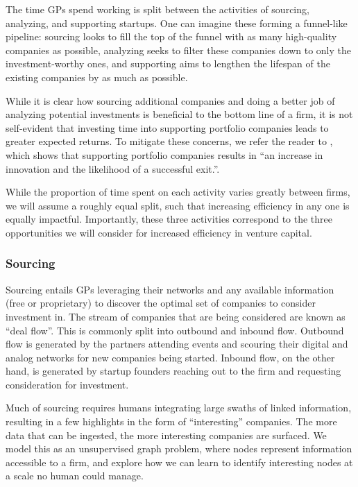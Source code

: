 The time GPs spend working is split between the activities of sourcing, analyzing, and supporting startups. One can imagine these forming a funnel-like pipeline: sourcing looks to fill the top of the funnel with as many high-quality companies as possible, analyzing seeks to filter these companies down to only the investment-worthy ones, and supporting aims to lengthen the lifespan of the existing companies by as much as possible.

While it is clear how sourcing additional companies and doing a better job of analyzing potential investments is beneficial to the bottom line of a firm, it is not self-evident that investing time into supporting portfolio companies leads to greater expected returns. To mitigate these concerns, we refer the reader to \cite{JOFI:JOFI12370}, which shows that supporting portfolio companies results in ``an increase in innovation and the likelihood of a successful exit.''.

While the proportion of time spent on each activity varies greatly between firms, we will assume a roughly equal split, such that increasing efficiency in any one is equally impactful. Importantly, these three activities correspond to the three opportunities we will consider for increased efficiency in venture capital.

\subsubsection{Sourcing}

Sourcing entails GPs leveraging their networks and any available information (free or proprietary) to discover the optimal set of companies to consider investment in. The stream of companies that are being considered are known as ``deal flow''. This is commonly split into outbound and inbound flow. Outbound flow is generated by the partners attending events and scouring their digital and analog networks for new companies being started. Inbound flow, on the other hand, is generated by startup founders reaching out to the firm and requesting consideration for investment.

Much of sourcing requires humans integrating large swaths of linked information, resulting in a few highlights in the form of ``interesting'' companies. The more data that can be ingested, the more interesting companies are surfaced. We model this as an unsupervised graph problem, where nodes represent information accessible to a firm, and explore how we can learn to identify interesting nodes at a scale no human could manage.

